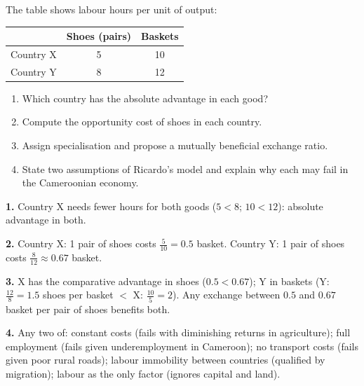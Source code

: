 \documentclass[11pt]{article}
\begin{document}
\begin{exercice}
The table shows labour hours per unit of output:

\begin{center}
\begin{tabular}{|l|c|c|}
\hline
\rowcolor{popblueL} & \textbf{Shoes (pairs)} & \textbf{Baskets} \\
\hline
Country X & 5 & 10 \\
\hline
Country Y & 8 & 12 \\
\hline
\end{tabular}
\end{center}

\begin{enumerate}
\item Which country has the absolute advantage in each good?
\item Compute the opportunity cost of shoes in each country.
\item Assign specialisation and propose a mutually beneficial exchange ratio.
\item State two assumptions of Ricardo's model and explain why each may fail in the Cameroonian economy.
\end{enumerate}
\end{exercice}

\begin{corrige}
\textbf{1.} Country X needs fewer hours for both goods ($5<8$; $10<12$): absolute advantage in both.

\textbf{2.} Country X: 1 pair of shoes costs $\frac{5}{10}=0.5$ basket. Country Y: 1 pair of shoes costs $\frac{8}{12}\approx 0.67$ basket.

\textbf{3.} X has the comparative advantage in shoes ($0.5<0.67$); Y in baskets (Y: $\frac{12}{8}=1.5$ shoes per basket $<$ X: $\frac{10}{5}=2$). Any exchange between $0.5$ and $0.67$ basket per pair of shoes benefits both.

\textbf{4.} Any two of: constant costs (fails with diminishing returns in agriculture); full employment (fails given underemployment in Cameroon); no transport costs (fails given poor rural roads); labour immobility between countries (qualified by migration); labour as the only factor (ignores capital and land).
\end{corrige}
\end{document}
